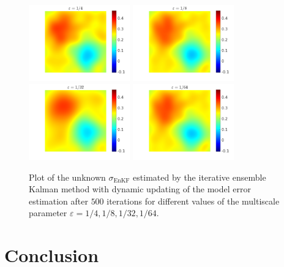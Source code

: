 \documentclass[10pt]{article}
\begin{document}
\begin{figure}[t]
\centering
\includegraphics[width = 0.39\textwidth]{figures/ensemble_500_e4_model_error_Levels}
\includegraphics[width = 0.39\textwidth]{figures/ensemble_500_e8_model_error_Levels}
\\
\includegraphics[width = 0.39\textwidth]{figures/ensemble_500_e32_model_error_Levels}
\includegraphics[width = 0.39\textwidth]{figures/ensemble_500_e64_model_error_Levels}
\caption{Plot of the unknown $\sigma_{\mathrm{EnKF}}$ estimated by the iterative ensemble Kalman method with dynamic updating of the model error estimation after $500$ iterations for different values of the multiscale parameter $\varepsilon = 1/4, 1/8, 1/32, 1/64$.}
\label{fig:comparison_e_model_error_levels}
\end{figure}

\section*{Conclusion}


\clearpage





\end{document}
